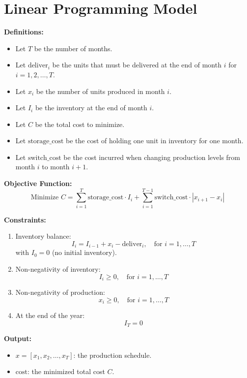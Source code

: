 \documentclass{article}
\begin{document}
\section*{Linear Programming Model}

\textbf{Definitions:}
\begin{itemize}
    \item Let $T$ be the number of months.
    \item Let $\text{deliver}_i$ be the units that must be delivered at the end of month $i$ for $i = 1, 2, \ldots, T$.
    \item Let $x_i$ be the number of units produced in month $i$.
    \item Let $I_i$ be the inventory at the end of month $i$.
    \item Let $C$ be the total cost to minimize.
    \item Let $\text{storage\_cost}$ be the cost of holding one unit in inventory for one month.
    \item Let $\text{switch\_cost}$ be the cost incurred when changing production levels from month $i$ to month $i+1$.
\end{itemize}

\textbf{Objective Function:}
\[
\text{Minimize } C = \sum_{i=1}^{T} \text{storage\_cost} \cdot I_i + \sum_{i=1}^{T-1} \text{switch\_cost} \cdot |x_{i+1} - x_i|
\]

\textbf{Constraints:}
\begin{enumerate}
    \item Inventory balance:
    \[
    I_i = I_{i-1} + x_i - \text{deliver}_i, \quad \text{for } i = 1, \ldots, T
    \]
    with $I_0 = 0$ (no initial inventory).
    
    \item Non-negativity of inventory:
    \[
    I_i \geq 0, \quad \text{for } i = 1, \ldots, T
    \]
    
    \item Non-negativity of production:
    \[
    x_i \geq 0, \quad \text{for } i = 1, \ldots, T
    \]
    
    \item At the end of the year:
    \[
    I_T = 0
    \]
\end{enumerate}

\textbf{Output:}
\begin{itemize}
    \item $x = [x_1, x_2, \ldots, x_T]$: the production schedule.
    \item $\text{cost}$: the minimized total cost $C$.
\end{itemize}
\end{document}

